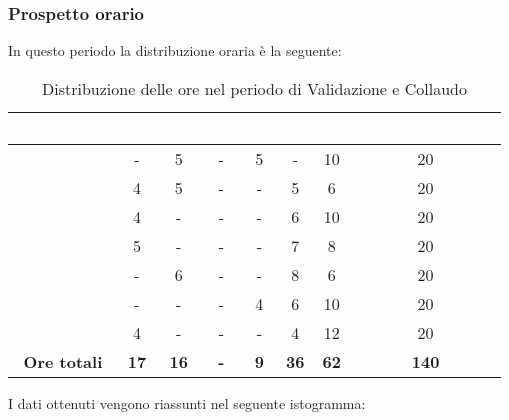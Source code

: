 \subsubsection{Prospetto orario}
In questo periodo la distribuzione oraria è la seguente:
\begin{table}[H]
	\begin{center}
		\begin{tabular}{ |c c c c c c c c| }
		\rowcolor{darkblue} 
		\textcolor{white}{\textbf{Nominativo}} & \textcolor{white}{\textbf{Re}} & \textcolor{white}{\textbf{Am}} & \textcolor{white}{\textbf{An}} & \textcolor{white}{\textbf{Pt}} & \textcolor{white}{\textbf{Pr}} & \textcolor{white}{\textbf{Ve}} & \textcolor{white}{\textbf{Ore Complessive}} \\ \hline
		\BL 	& -  	& 5  	& - 	& 5 	& - 	& 10 	& 20 \\ \hline
		\FF 	& 4  	& 5  	& - 	& - 	& 5 	& 6  	& 20 \\ \hline
		\MM 	& 4 	& - 	& - 	& - 	& 6 	& 10  	& 20 \\ \hline
		\PC 	& 5 	& -  	& - 	& - 	& 7 	& 8 	& 20 \\ \hline
		\TG 	& -  	& 6 	& - 	& - 	& 8 	& 6 	& 20 \\ \hline
		\TL 	& -  	& - 	& - 	& 4 	& 6 	& 10 	& 20 \\ \hline
		\VD 	& 4  	& -  	& - 	& - 	& 4 	& 12  	& 20 \\ \hline
		\textbf{Ore totali} & \textbf{17} & \textbf{16} & \textbf{-} & \textbf{9} & \textbf{36} & \textbf{62} & \textbf{140} \\ \hline
		\end{tabular}
	\caption{Distribuzione delle ore nel periodo di Validazione e Collaudo}
	\end{center}
\end{table}
I dati ottenuti vengono riassunti nel seguente istogramma:
